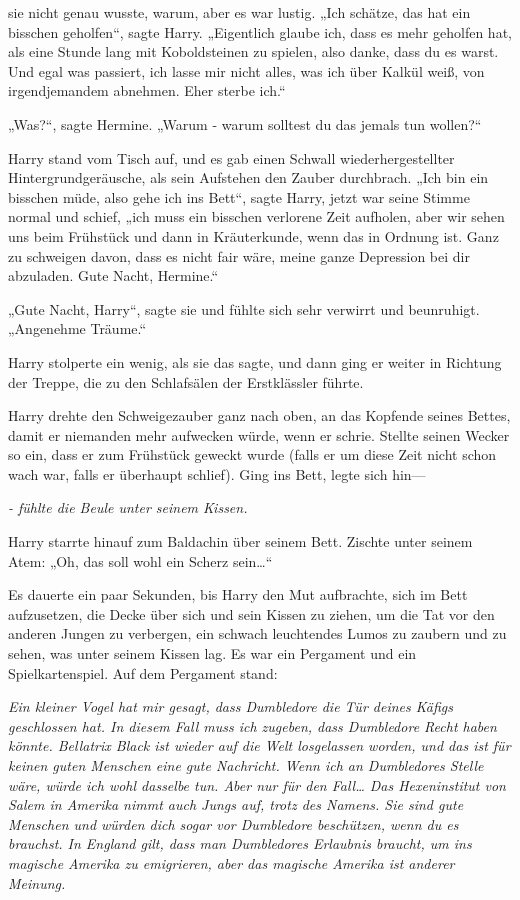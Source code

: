 {sie nicht genau wusste, warum, aber es war lustig. „Ich schätze, das hat ein bisschen geholfen“, sagte Harry. „Eigentlich glaube ich, dass es mehr geholfen hat, als eine Stunde lang mit Koboldsteinen zu spielen, also danke, dass du es warst. Und egal was passiert, ich lasse mir nicht alles, was ich über Kalkül weiß, von irgendjemandem abnehmen. Eher sterbe ich.“

„Was?“, sagte Hermine. „Warum - warum solltest du das jemals tun wollen?“

Harry stand vom Tisch auf, und es gab einen Schwall wiederhergestellter Hintergrundgeräusche, als sein Aufstehen den Zauber durchbrach. „Ich bin ein bisschen müde, also gehe ich ins Bett“, sagte Harry, jetzt war seine Stimme normal und schief, „ich muss ein bisschen verlorene Zeit aufholen, aber wir sehen uns beim Frühstück und dann in Kräuterkunde, wenn das in Ordnung ist. Ganz zu schweigen davon, dass es nicht fair wäre, meine ganze Depression bei dir abzuladen. Gute Nacht, Hermine.“

„Gute Nacht, Harry“, sagte sie und fühlte sich sehr verwirrt und beunruhigt. „Angenehme Träume.“

Harry stolperte ein wenig, als sie das sagte, und dann ging er weiter in Richtung der Treppe, die zu den Schlafsälen der Erstklässler führte.

Harry drehte den Schweigezauber ganz nach oben, an das Kopfende seines Bettes, damit er niemanden mehr aufwecken würde, wenn er schrie. Stellte seinen Wecker so ein, dass er zum Frühstück geweckt wurde (falls er um diese Zeit nicht schon wach war, falls er überhaupt schlief). Ging ins Bett, legte sich hin—

\emph{\hfill\break - fühlte die Beule unter seinem Kissen.}

Harry starrte hinauf zum Baldachin über seinem Bett. Zischte unter seinem Atem: „Oh, das soll wohl ein Scherz sein…“

Es dauerte ein paar Sekunden, bis Harry den Mut aufbrachte, sich im Bett aufzusetzen, die Decke über sich und sein Kissen zu ziehen, um die Tat vor den anderen Jungen zu verbergen, ein schwach leuchtendes Lumos zu zaubern und zu sehen, was unter seinem Kissen lag. Es war ein Pergament und ein Spielkartenspiel. Auf dem Pergament stand:

\emph{Ein kleiner Vogel hat mir gesagt, dass Dumbledore die Tür deines Käfigs geschlossen hat. In diesem Fall muss ich zugeben, dass Dumbledore Recht haben könnte. Bellatrix Black ist wieder auf die Welt losgelassen worden, und das ist für keinen guten Menschen eine gute Nachricht. Wenn ich an Dumbledores Stelle wäre, würde ich wohl dasselbe tun. Aber nur für den Fall… Das Hexeninstitut von Salem in Amerika nimmt auch Jungs auf, trotz des Namens. Sie sind gute Menschen und würden dich sogar vor Dumbledore beschützen, wenn du es brauchst. In England gilt, dass man Dumbledores Erlaubnis braucht, um ins magische Amerika zu emigrieren, aber das magische Amerika ist anderer Meinung.}

}
